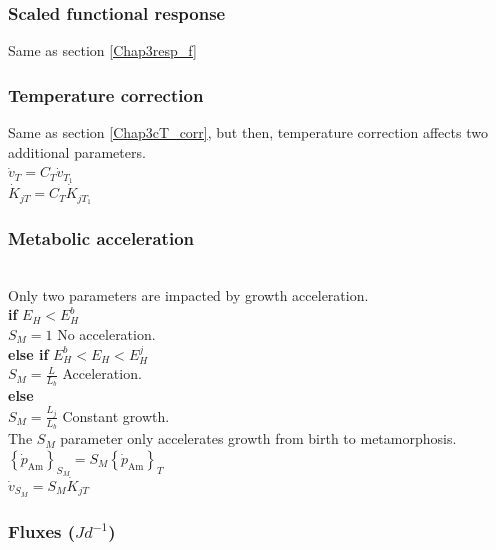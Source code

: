 \subsubsection{Scaled functional response}\label{Chap4resp_f}
Same as section \ref{Chap3resp_f}

\subsubsection{Temperature correction}\label{Chap4cT_corr}
Same as section \ref{Chap3cT_corr}, but then, temperature correction affects two additional parameters.\\

$\dot{v}_{T} = C_{T} \dot{v}_{T_{1}}$\\

$\dot{K}_{jT} = C_{T} \dot{K}_{jT_{1}}$\\

\subsubsection{Metabolic acceleration}\label{Chap4Acc}
\hfill \\

Only two parameters are impacted by growth acceleration.\\

\textbf{if}	$E_{H} < E_{H}^b$\\

$S_{M} = 1$ \hfill No acceleration.\\

\textbf{else if} $E_{H}^b < E_{H} < E_{H}^j$\\

$S_{M} = \frac{L}{L_{b}}$ \hfill Acceleration.\\

\textbf{else}\\

$S_{M} = \frac{L_{j}}{L_{b}}$ \hfill Constant growth.\\

The $S_{M}$ parameter only accelerates growth from birth to metamorphosis.\\

$\left \{ \dot{p}_\mathrm{Am} \right \}_{S_{M}} = S_{M} \left \{ \dot{p}_\mathrm{Am} \right \}_{T}$\\

$\dot{v}_{S_{M}} = S_{M} \dot{K}_{jT}$\\

\subsubsection{Fluxes ($Jd^{-1}$)}\label{Chap4Fluxex}
\hfill \\

